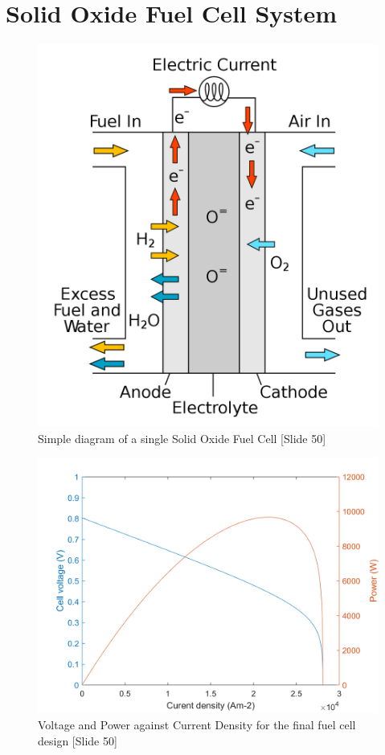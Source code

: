 \documentclass[11pt, oneside]{article}
\begin{document}
\section{Solid Oxide Fuel Cell System}

   \begin{figure}[htb]
        \centering
        \includegraphics[scale=0.25]{1200px-Solid_oxide_fuel_cell.png}
        \caption{Simple diagram of a single Solid Oxide Fuel Cell [Slide 50]}
        \label{fig:SOFCbasic}
    \end{figure}
    
   \begin{figure}[htb]
        \centering
        \includegraphics[scale=0.4]{power_voltage_against_current.png}
        \caption{Voltage and Power against Current Density for the final fuel cell design [Slide 50]}
        \label{fig:SOFCbasic}
    \end{figure}
   
\end{document}
